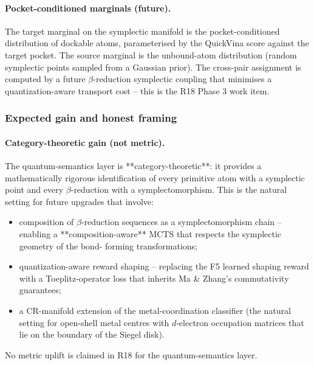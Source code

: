 \paragraph{Pocket-conditioned marginals (future).}
The target marginal on the symplectic manifold is the
pocket-conditioned distribution of dockable atoms, parameterised
by the QuickVina score against the target pocket.  The
source marginal is the unbound-atom distribution (random
symplectic points sampled from a Gaussian prior).  The
cross-pair assignment is computed by a future $\beta$-reduction
symplectic coupling that minimises a quantization-aware
transport cost -- this is the R18 Phase 3 work item.

\subsubsection{Expected gain and honest framing}
\label{sec:method:quantum-semantics-expected}

\paragraph{Category-theoretic gain (not metric).}
The quantum-semantics layer is **category-theoretic**: it
provides a mathematically rigorous identification of every
primitive atom with a symplectic point and every $\beta$-reduction
with a symplectomorphism.  This is the natural setting for
future upgrades that involve:
\begin{itemize}
  \item composition of $\beta$-reduction sequences as a
    symplectomorphism chain -- enabling a **composition-aware**
    MCTS that respects the symplectic geometry of the bond-
    forming transformations;
  \item quantization-aware reward shaping -- replacing the F5
    learned shaping reward with a Toeplitz-operator loss that
    inherits Ma \& Zhang's commutativity guarantees;
  \item a CR-manifold extension of the metal-coordination
    classifier (the natural setting for open-shell metal
    centres with $d$-electron occupation matrices that lie on
    the boundary of the Siegel disk).
\end{itemize}
No metric uplift is claimed in R18 for the quantum-semantics
layer.

